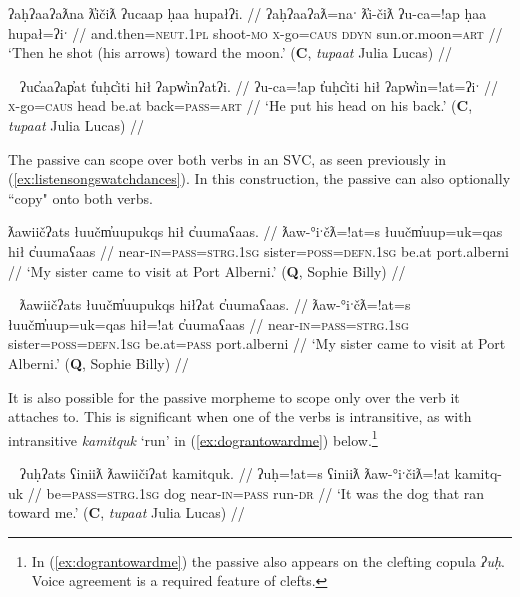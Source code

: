\ex \label{ex:shootatthemoon}
\begingl
\glpreamble ʔaḥʔaaʔaƛna ƛ̓ičiƛ ʔucaap ḥaa hupałʔi. //
\gla ʔaḥʔaaʔaƛ=naˑ ƛ̓i-čiƛ ʔu-ca=!ap ḥaa hupał=ʔiˑ //
\glb and.then=\textsc{neut.1pl} shoot-\textsc{mo} \textsc{x}-go=\textsc{caus} \textsc{ddyn} sun.or.moon=\textsc{art} //
\glft `Then he shot (his arrows) toward the moon.' (\textbf{C}, \textit{tupaat} Julia Lucas) //
\endgl
\xe

\ex~ \label{ex:headonback}
\begingl
\glpreamble ʔuc̓aaʔap̓at t̓uḥc̓iti hił ʔapw̓inʔatʔi. //
\gla ʔu-ca=!ap t̓uḥc̓iti hił ʔapw̓in=!at=ʔiˑ //
\glb \textsc{x}-go=\textsc{caus} head be.at back=\textsc{pass}\footnotemark=\textsc{art} //
\glft `He put his head on his back.' (\textbf{C}, \textit{tupaat} Julia Lucas) //
\endgl
\xe


The passive can scope over both verbs in an SVC, as seen previously in (\ref{ex:listensongswatchdances}). In this construction, the passive can also optionally ``copy" onto both verbs.

\ex \label{ex:sistervisit2}
\begingl
\glpreamble ƛawiičʔats łuučm̓uupukqs hił c̓uumaʕaas. //
\gla ƛaw-°iˑčƛ=!at=s łuučm̓uup=uk=qas hił c̓uumaʕaas //
\glb near-\textsc{in}=\textsc{pass}=\textsc{strg.1sg} sister=\textsc{poss}=\textsc{defn.1sg} be.at port.alberni //
\glft `My sister came to visit at Port Alberni.' (\textbf{Q}, Sophie Billy) //
\endgl
\xe

\ex~ \label{ex:sistervisit1}
\begingl
\glpreamble ƛawiičʔats łuučm̓uupukqs hiłʔat c̓uumaʕaas. //
\gla ƛaw-°iˑčƛ=!at=s łuučm̓uup=uk=qas hił=!at c̓uumaʕaas //
\glb near-\textsc{in}=\textsc{pass}=\textsc{strg.1sg} sister=\textsc{poss}=\textsc{defn.1sg} be.at=\textsc{pass} port.alberni //
\glft `My sister came to visit at Port Alberni.' (\textbf{Q}, Sophie Billy) //
\endgl
\xe

It is also possible for the passive morpheme to scope only over the verb it attaches to. This is significant when one of the verbs is intransitive, as with intransitive \textit{kamitquk} `run' in (\ref{ex:dograntowardme}) below.\footnote{In (\ref{ex:dograntowardme}) the passive also appears on the clefting copula \textit{ʔuḥ}. Voice agreement is a required feature of clefts.}

\ex~ \label{ex:dograntowardme}
\begingl
\glpreamble ʔuḥʔats ʕiniiƛ ƛawiičiʔat kamitquk. //
\gla ʔuḥ=!at=s ʕiniiƛ ƛaw-°iˑčiƛ=!at kamitq-uk //
\glb be=\textsc{pass}=\textsc{strg.1sg} dog near-\textsc{in}=\textsc{pass} run-\textsc{dr} //
\glft `It was the dog that ran toward me.' (\textbf{C}, \textit{tupaat} Julia Lucas) //
\endgl
\xe

